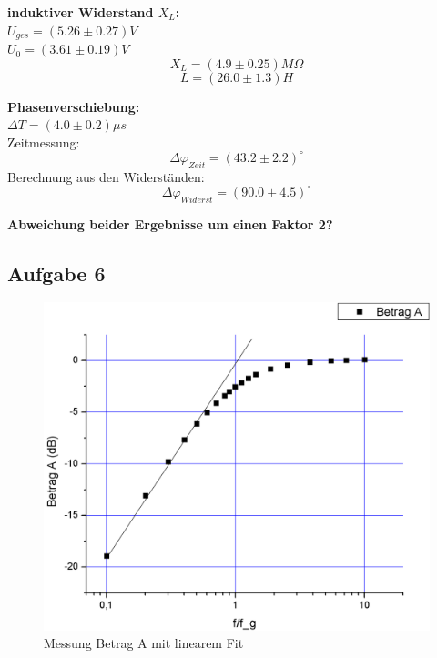 \documentclass[12pt,a4paper]{article}
\begin{document}
\begin{multicols}{2}
\textbf{induktiver Widerstand $X_L$:}\\
$U_{ges}=(5.26\pm 0.27)V$\\
$U_0=(3.61 \pm 0.19)V$\\
$$X_L=(4.9\pm 0.25)M\Omega$$
$$L=(26.0 \pm 1.3)H$$

\textbf{Phasenverschiebung:}\\
$\Delta T = (4.0\pm 0.2) \mu s$\\
Zeitmessung:
$$\Delta \varphi_{Zeit} = (43.2 \pm 2.2)^\circ$$
Berechnung aus den Widerständen:
$$\Delta \varphi_{Widerst} = (90.0 \pm 4.5)^\circ$$

\noindent \textbf{Abweichung beider Ergebnisse um einen Faktor 2?}



\end{multicols}
\subsection{Aufgabe 6}
\begin{figure}[H]
	\centering
	\includegraphics[scale=0.40]{./figure/betrag_a.png}
	\caption{Messung Betrag A mit linearem Fit}
	\label{fig:betraga_linfit}
\end{figure}
\end{document}
